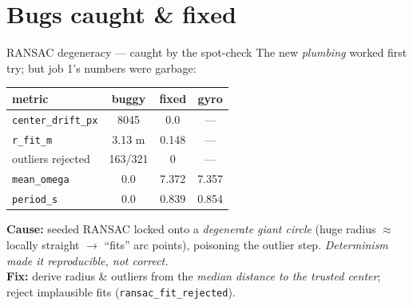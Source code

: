 \documentclass[10pt,aspectratio=169]{beamer}
\newcommand{\gd}[1]{\textcolor{good}{#1}}
\newcommand{\bd}[1]{\textcolor{bad}{#1}}
\begin{document}
\section{Bugs caught \& fixed}

\begin{frame}{RANSAC degeneracy --- caught by the spot-check}
The new \emph{plumbing} worked first try; \bd{but job 1's numbers were garbage:}
\centering\small
\begin{tabular}{lccc}
\toprule
metric & \bd{buggy} & \gd{fixed} & gyro \\
\midrule
\texttt{center\_drift\_px} & 8045 & \gd{0.0} & --- \\
\texttt{r\_fit\_m} & 3.13 m & \gd{0.148} & --- \\
outliers rejected & 163/321 & \gd{0} & --- \\
\texttt{mean\_omega} & 0.0 & \gd{7.372} & 7.357 \\
\texttt{period\_s} & 0.0 & \gd{0.839} & 0.854 \\
\bottomrule
\end{tabular}
\par\vspace{0.5em}
\footnotesize
\textbf{Cause:} seeded RANSAC locked onto a \emph{degenerate giant circle} (huge radius $\approx$ locally straight $\to$ ``fits'' arc points), poisoning the outlier step. \emph{Determinism made it reproducible, not correct.}\\
\textbf{Fix:} derive radius \& outliers from the \emph{median distance to the trusted center}; reject implausible fits (\texttt{ransac\_fit\_rejected}).
\end{frame}
\end{document}

